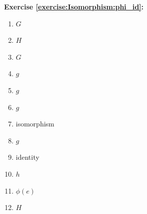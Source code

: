 \noindent\textbf{Exercise \ref{exercise:Isomorphism:phi_id}:}


\begin{multicols}{3}
\begin{enumerate}
\item
$G$

\item
$H$

\item
$G$

\item
$g$

\item
$g$

\item
$g$

\item
isomorphism

\item
$g$

\item
identity

\item
$h$

\item
$\phi(e)$

\item
$H$
\end{enumerate}
\end{multicols}


